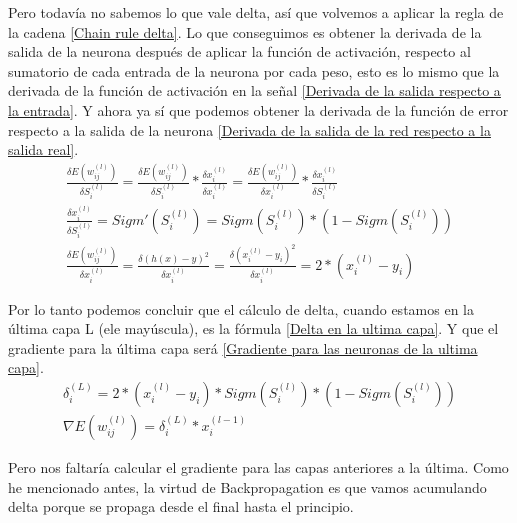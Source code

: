 Pero todavía no sabemos lo que vale delta, así que volvemos a aplicar la regla de la cadena \ref{Chain rule delta}. Lo que conseguimos es obtener la derivada de la salida de la neurona después de aplicar la función de activación, respecto al sumatorio de cada entrada de la neurona por cada peso, esto es lo mismo que la derivada de la función de activación en la señal \ref{Derivada de la salida respecto a la entrada}. Y ahora ya sí que podemos obtener la derivada de la función de error respecto a la salida de la neurona \ref{Derivada de la salida de la red respecto a la salida real}.
\begin{subequations}
	\begin{eqnarray}
		\frac{\delta E(w_{ij}^{(l)})}{\delta S_{i}^{(l)}} = \frac{\delta E(w_{ij}^{(l)})}{\delta S_{i}^{(l)}} * \frac{\delta x_{i}^{(l)}}{\delta x_{i}^{(l)}} = \frac{\delta E(w_{ij}^{(l)})}{\delta x_{i}^{(l)}} * \frac{\delta x_{i}^{(l)}}{\delta S_{i}^{(l)}} \label{Chain rule delta} \\
		\frac{\delta x_{i}^{(l)}}{\delta S_{i}^{(l)}} = Sigm'(S_{i}^{(l)}) = Sigm(S_{i}^{(l)}) * (1 - Sigm(S_{i}^{(l)})) \label{Derivada de la salida respecto a la entrada} \\
		\frac{\delta E(w_{ij}^{(l)})}{\delta x_{i}^{(l)}} = \frac{\delta (h(x) - y)^2}{\delta x_{i}^{(l)}} = \frac{\delta (x_{i}^{(l)} - y_{i})^2}{\delta x_{i}^{(l)}} = 2 * (x_{i}^{(l)} - y_{i}) \label{Derivada de la salida de la red respecto a la salida real}
	\end{eqnarray}
\end{subequations}

Por lo tanto podemos concluir que el cálculo de delta, cuando estamos en la última capa L (ele mayúscula), es la fórmula \ref{Delta en la ultima capa}. Y que el gradiente para la última capa será \ref{Gradiente para las neuronas de la ultima capa}.
\begin{subequations}
	\begin{eqnarray}
		\delta_{i}^{(L)} = 2 * (x_{i}^{(l)} - y_{i}) * Sigm(S_{i}^{(l)}) * (1 - Sigm(S_{i}^{(l)})) \label{Delta en la ultima capa} \\
		\nabla E(w_{ij}^{(l)}) = \delta_{i}^{(L)}  * x_{i}^{(l-1)} \label{Gradiente para las neuronas de la ultima capa}
	\end{eqnarray}
\end{subequations}

Pero nos faltaría calcular el gradiente para las capas anteriores a la última. Como he mencionado antes, la virtud de Backpropagation es que vamos acumulando delta porque se propaga desde el final hasta el principio. 

